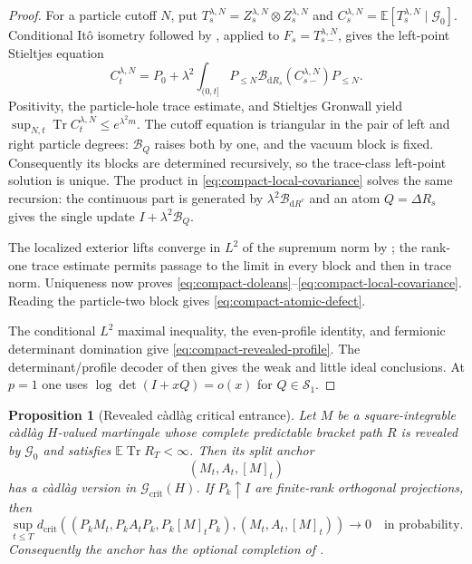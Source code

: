 \documentclass[10pt,reqno]{amsart}
\theoremstyle{plain}
\newtheorem{proposition}[theorem]{Proposition}
\theoremstyle{definition}
\theoremstyle{remark}
\begin{document}
\begin{proof}
For a particle cutoff $N$, put
$T_s^{\lambda,N}=Z_s^{\lambda,N}\otimes Z_s^{\lambda,N}$ and
$C_s^{\lambda,N}=\mathbb E[T_s^{\lambda,N}\mid\mathcal G_0]$.
Conditional It\^o isometry followed by
, applied to
$F_s=T_{s-}^{\lambda,N}$, gives the left-point Stieltjes equation
\[
 C_t^{\lambda,N}
 =P_0+\lambda^2\int_{(0,t]}
 P_{\le N}\mathcal B_{\mathrm dR_s}(C_{s-}^{\lambda,N})P_{\le N}.
\]
Positivity, the particle-hole trace estimate, and Stieltjes Gronwall yield
$\sup_{N,t}\operatorname{Tr}C_t^{\lambda,N}\le e^{\lambda^2m}$.
The cutoff equation is triangular in the pair of left and right particle
degrees: $\mathcal B_Q$ raises both by one, and the vacuum block is fixed.
Consequently its blocks are determined recursively, so the trace-class
left-point solution is unique.  The product in
\eqref{eq:compact-local-covariance} solves the same recursion: the continuous
part is generated by $\lambda^2\mathcal B_{\mathrm dR^c}$ and an atom
$Q=\Delta R_s$ gives the single update
$I+\lambda^2\mathcal B_Q$.

The localized exterior lifts converge in $L^2$ of the supremum norm by
; the rank-one trace estimate permits
passage to the limit in every block and then in trace norm.  Uniqueness now
proves \eqref{eq:compact-doleans}--\eqref{eq:compact-local-covariance}.  Reading the
particle-two block gives \eqref{eq:compact-atomic-defect}.

The conditional $L^2$ maximal inequality, the even-profile identity, and
fermionic determinant domination give \eqref{eq:compact-revealed-profile}.
The determinant/profile decoder of 
then gives the weak and little ideal conclusions.  At $p=1$ one uses
$\log\det(I+xQ)=o(x)$ for $Q\in\mathcal S_1$.
\end{proof}


\begin{proposition}[Revealed c\`adl\`ag critical entrance]
\label{prop:revealed-cadlag-critical-entrance}
Let $M$ be a square-integrable c\`adl\`ag $H$-valued martingale whose complete
predictable bracket path $R$ is revealed by $\mathcal G_0$ and satisfies
$\mathbb E\operatorname{Tr}R_T<\infty$.  Then its split anchor
\[
 (M_t,A_t,[M]_t)
\]
has a c\`adl\`ag version in $\mathscr G_{\mathrm{crit}}(H)$.  If
$P_k\uparrow I$ are finite-rank orthogonal projections, then
\begin{equation}
 \sup_{t\le T}d_{\mathrm{crit}}\!\left(
 (P_kM_t,P_kA_tP_k,P_k[M]_tP_k),(M_t,A_t,[M]_t)\right)
 \longrightarrow0
 \quad\text{in probability}.
 \label{eq:revealed-cadlag-projection}
\end{equation}
Consequently the anchor has the optional completion of
.
\end{proposition}
\end{document}
